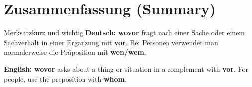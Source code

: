 \documentclass[a4paper,11pt]{article}
\newcommand{\GermanText}[1]{\textbf{Deutsch: }#1\par}
\newcommand{\EnglishText}[1]{{\small\color{SoftGray}\textbf{English: }#1\par}}
\begin{document}
\section{Zusammenfassung (Summary)}
\begin{grammarentry}{Merksatz}{kurz und wichtig}
\GermanText{\textbf{wovor} fragt nach einer Sache oder einem Sachverhalt in einer Ergänzung mit \textbf{vor}. Bei Personen verwendet man normalerweise die Präposition mit \textbf{wen/wem}.}
\EnglishText{\textbf{wovor} asks about a thing or situation in a complement with \textbf{vor}. For people, use the preposition with \textbf{whom}.}
\end{grammarentry}
\end{document}
